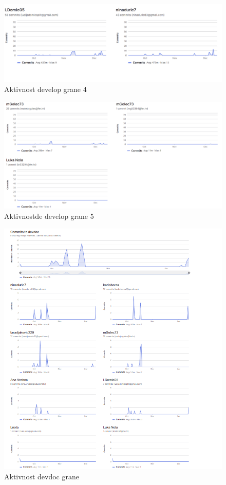 		\begin{figure}[H]
			\includegraphics[scale=0.6]{slike/git4.png} %
			\centering
			\caption{Aktivnost develop grane 4}
			\label{fig:aktivnost4}
		\end{figure}
		\begin{figure}[H]
			\includegraphics[scale=0.6]{slike/git5.png} %
			\centering
			\caption{Aktivnostde develop grane 5}
			\label{fig:aktivnost5}
		\end{figure}
		\begin{figure}[H]
			\includegraphics[scale=1.0]{slike/git6.png} %
			\centering
			\caption{Aktivnost devdoc grane}
			\label{fig:aktivnost6}
		\end{figure}
	
